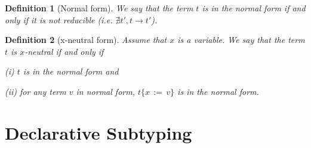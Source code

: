 \documentclass[a4,natbib=false]{article}
\newtheorem{definition}{Definition}
\newcommand{\subst}[3]{{#1}\{{#2}\,:=\,{#3}\}}
\newcommand{\reduces}[2]{{#1} \rightarrow {#2}}
\begin{document}
\begin{definition}[Normal form]

  We say that the term $t$ is in the normal form if and only if it is not reducible (i.e. 
  $\nexists t', \reduces{t}{t'}$).

\end{definition}

\begin{definition} [x-neutral form]
  Assume that $x$ is a variable.
  We say that the term $t$ is $x$-neutral if and only if
  \begin{enumerate*}
  \item[(i)]  $t$ is in the normal form
    and
  \item[(ii)] for any term $v$ in normal form, $\subst{t}{x}{v}$ is in the normal form.
  \end{enumerate*}
\end{definition}




\section{Declarative Subtyping}
\end{document}
